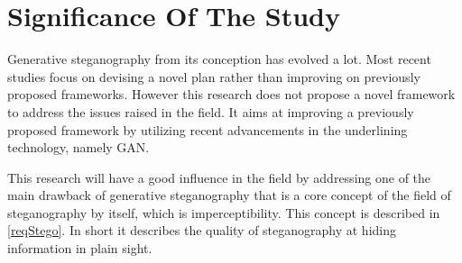 \documentclass[../main/main.tex]{subfiles}
\begin{document}
	\section{Significance Of The Study}
	Generative steganography from its conception has evolved a lot. Most recent studies focus on devising a novel plan rather than improving on previously proposed frameworks. However this research does not propose a novel framework to address the issues raised in the field. It aims at improving a previously proposed framework by utilizing recent advancements in the underlining technology, namely \gls{GAN}. 
	
	This research will have a good influence in the field by addressing one of the main drawback of generative steganography that is a core concept of the field of steganography by itself, which is imperceptibility. This concept is described in \ref{reqStego}. In short it describes the quality of steganography at hiding information in plain sight. 
\end{document}

